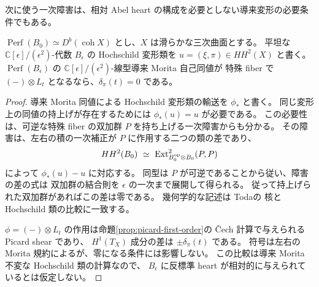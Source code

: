 次に使う一次障害は、相対 Abel heart の構成を必要としない導来変形の必要条件でもある。
\begin{lemma}[導来自己同値の一次必要条件]
\label{lem:derived-picard-tangent-necessity}
$\operatorname{Perf}(B_0)\simeq D^b(\operatorname{coh}X)$ とし、$X$ は滑らかな三次曲面とする。
平坦な $\mathbb C[\epsilon]/(\epsilon^2)$-代数 $B_\epsilon$ の
Hochschild 変形類を $u=(\xi,\pi)\in HH^2(X)$ と書く。
$\operatorname{Perf}(B_\epsilon)$ の $\mathbb C[\epsilon]/(\epsilon^2)$-線型導来 Morita 自己同値が
特殊 fiber で $(-)\otimes L_t$ となるなら、$\delta_\pi(t)=0$ である。
\end{lemma}
\begin{proof}
導来 Morita 同値による Hochschild 変形類の輸送を $\phi_*$ と書く。
同じ変形上の同値の持上げが存在するためには $\phi_*(u)=u$ が必要である。
この必要性は、可逆な特殊 fiber の双加群 $P$ を持ち上げる一次障害からも分かる。
その障害は、左右の積の一次補正が $P$ に作用する二つの類の差であり、
\[
 HH^2(B_0)\ \simeq\
 \operatorname{Ext}^2_{B_0^{\rm op}\otimes B_0}(P,P)
\]
によって $\phi_*(u)-u$ に対応する。
同型は $P$ が可逆であることから従い、障害の差の式は
双加群の結合則を $\epsilon$ の一次まで展開して得られる。
従って持上げられた双加群があればこの差は零である。
幾何学的な記述は Toda\cite[Proposition 5.6, Lemma 5.8, \S6]{Toda}の
核と Hochschild 類の比較に一致する。

$\phi=(-)\otimes L_t$ の作用は命題\ref{prop:picard-first-order}の
\v{C}ech 計算で与えられる Picard shear であり、
$H^1(T_X)$ 成分の差は $\pm\delta_\pi(t)$ である。
符号は左右の Morita 規約によるが、零になる条件には影響しない。
この比較は導来 Morita 不変な Hochschild 類の計算なので、
$B_\epsilon$ に反標準 heart が相対的に与えられているとは仮定しない。
\end{proof}

